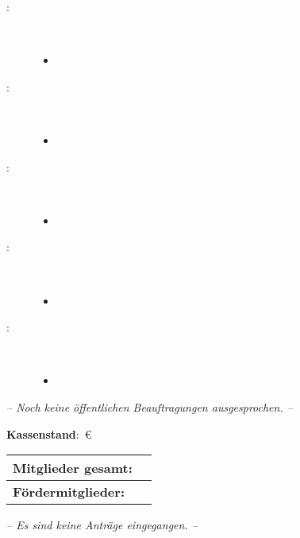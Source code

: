 \begin{Protokoll}
	
	\begin{description}
		\item[:] \     
		\begin{itemize}
			\item
		\end{itemize}
		\item[:] \     
		\begin{itemize}
			\item 
		\end{itemize}
		\item[:] \     
		\begin{itemize}
			\item 
		\end{itemize}
		\item[:] \     
		\begin{itemize}
			\item
		\end{itemize}
		\item[\getPersonAsWebsiteLink{FeW}:] \     
		\begin{itemize}
			\item 
		\end{itemize}
	\end{description}

	
	\emph{-- Noch keine öffentlichen Beauftragungen ausgesprochen. --}
	
	
	\textbf{Kassenstand}: \,\euro
	
	\begin{center}
		\begin{tabular}{|l||r|}
			\hline
			\textbf{Mitglieder gesamt:}             &   \\
			\hline
			\textbf{Fördermitglieder:}				&  \\                
			\hline
			\hline
		\end{tabular}
	\end{center}
	
	\emph{-- Es sind keine Anträge eingegangen. --}
	
	
	\begin{description}
		\item
	\end{description}
	

\end{Protokoll}
